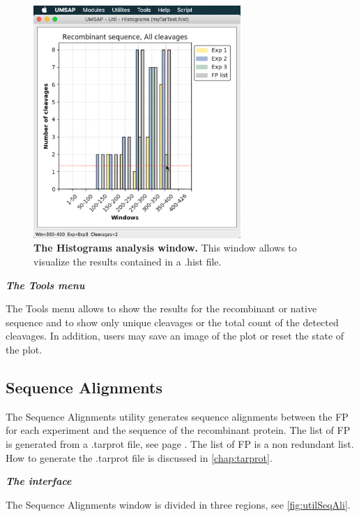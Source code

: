 \begin{figure}[h]
	\centering
	\includegraphics[width=0.7\textwidth]{./IMAGES/UTIL-HIST-WINDOW/util-histo-res.jpg}	    
	\caption[The Histograms analysis window]{\textbf{The Histograms analysis window.} This window allows to visualize the results contained in a .hist file.} 
	\label{fig:utilHistoCutShow}
	\vspace{-5pt} 	
\end{figure}

\textit{\textbf{The Tools menu}}

The Tools menu allows to show the results for the recombinant or native sequence and to show only unique cleavages or the total count of the detected cleavages. In addition, users may save an image of the plot or reset the state of the plot.

\subsection{Sequence Alignments}
\label{subsec:utilSeqAli}
The Sequence Alignments utility generates sequence alignments between the FP for each experiment and the sequence of the recombinant protein. The list of FP is generated from a .tarprot file, see page \pageref{par:tarprotPIP}. The list of FP is a non redundant list. How to generate the .tarprot file is discussed in \autoref{chap:tarprot}.

\textit{\textbf{The interface}}

The Sequence Alignments window is divided in three regions, see \autoref{fig:utilSeqAli}.

